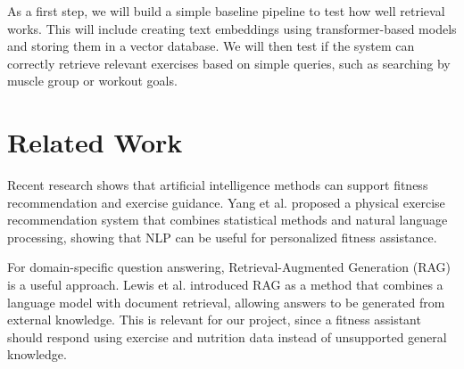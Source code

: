 \documentclass[fleqn,moreauthors,10pt]{ds_report}
\begin{document}
As a first step, we will build a simple baseline pipeline to test how well retrieval works. This will include creating text embeddings using transformer-based models and storing them in a vector database. We will then test if the system can correctly retrieve relevant exercises based on simple queries, such as searching by muscle group or workout goals.

\section*{Related Work}

Recent research shows that artificial intelligence methods can support fitness recommendation and exercise guidance. Yang et al. \cite{Yang2023} proposed a physical exercise recommendation system that combines statistical methods and natural language processing, showing that NLP can be useful for personalized fitness assistance.

For domain-specific question answering, Retrieval-Augmented Generation (RAG) is a useful approach. Lewis et al. \cite{Lewis2020} introduced RAG as a method that combines a language model with document retrieval, allowing answers to be generated from external knowledge. This is relevant for our project, since a fitness assistant should respond using exercise and nutrition data instead of unsupported general knowledge.



\end{document}
